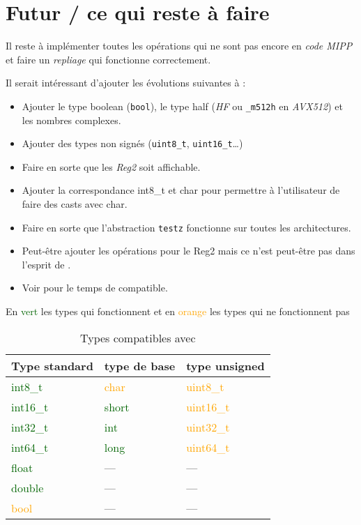 \section{Futur / ce qui reste à faire}

Il reste à implémenter toutes les opérations qui ne sont pas encore en \emph{code MIPP} et
faire un \textit{repliage} qui fonctionne correctement.

Il serait intéressant d'ajouter les évolutions suivantes à \MIPP :

\begin{itemize}
  \item Ajouter le type boolean (\verb|bool|), le type half (\emph{HF} ou
  \verb|_m512h| en \emph{AVX512}) et les nombres complexes.
  \item Ajouter des types non signés (\verb|uint8_t|, \verb|uint16_t|\dots)
  \item Faire en sorte que les \emph{Reg2} soit affichable.
  \item Ajouter la correspondance int8_t et char pour permettre à l'utilisateur de faire
  des casts avec char.
  \item Faire en sorte que l'abstraction \verb|testz| fonctionne sur toutes les architectures.
  \item Peut-être ajouter les opérations pour le Reg2 mais ce n'est peut-être pas dans
  l'esprit de \MIPP.
  \item Voir pour le temps de compatible. %
\end{itemize}

\begin{table}[H]
  \centering
  \caption*{En \textcolor{darkGreen}{vert} les types qui fonctionnent et en \textcolor{orange}{orange}
    les types qui ne fonctionnent pas}
  \begin{tabular}[H]{|l|l|l|}
    \hline
    \textbf{Type standard}          & \textbf{type de base}        & \textbf{type unsigned}        \\
    \hline
    \textcolor{darkGreen}{int8_t}  & \textcolor{orange}{char}     & \textcolor{orange}{uint8_t}  \\
    \hline
    \textcolor{darkGreen}{int16_t} & \textcolor{darkGreen}{short} & \textcolor{orange}{uint16_t} \\
    \hline
    \textcolor{darkGreen}{int32_t} & \textcolor{darkGreen}{int}   & \textcolor{orange}{uint32_t} \\
    \hline
    \textcolor{darkGreen}{int64_t} & \textcolor{darkGreen}{long}  & \textcolor{orange}{uint64_t} \\
    \hline
    \textcolor{darkGreen}{float}    & \----                        & \----                         \\
    \hline
    \textcolor{darkGreen}{double}   & \----                        & \----                         \\
    \hline
    \textcolor{orange}{bool}        & \----                        & \----                         \\
    \hline
  \end{tabular}
  \caption{Types compatibles avec \MIPP}
\end{table}

